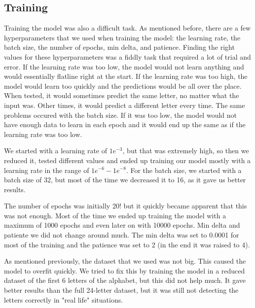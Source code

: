 \documentclass[../paper.tex]{subfiles}
\begin{document}
\subsection{Training}
Training the model was also a difficult task.
As mentioned before, there are a few hyperparameters that we used when training the model: the learning rate, the batch size, the number of epochs, min delta, and patience.
Finding the right values for these hyperparameters was a fiddly task that required a lot of trial and error. If the learning rate was too low, the model would not learn anything
and would essentially flatline right at the start. If the learning rate was too high, the model would learn too quickly and the predictions would be all over the place.
When tested, it would sometimes predict the same letter, no matter what the input was. Other times, it would predict a different letter every time.
The same problems occured with the batch size. If it was too low, the model would not have enough data to learn in each epoch and it would end up the same as if the learning rate was too low.

We started with a learning rate of $1e^{-3}$, but that was extremely high, so then we reduced it, tested different values and ended up training our model mostly with a learning rate in the range of $ 1e^{-6} - 1e^{-8}$.
For the batch size, we started with a batch size of 32, but most of the time we decreased it to 16, as it gave us better results.

The number of epochs was initially 20! but it quickly became apparent that this was not enough. Most of the time we ended up training the model with a maximum of 1000 epochs and even later on with 10000 epochs.
Min delta and patiente we did not change around much. The min delta was set to 0.0001 for most of the training and the patience was set to 2 (in the end it was raised to 4).

As mentioned previously, the dataset that we used was not big. This caused the model to overfit quickly.
We tried to fix this by training the model in a reduced dataset of the first 6 letters of the alphabet, but this did not help much. It gave better results than the full 24-letter dataset, but it was still 
not detecting the letters correctly in "real life" situations.
\end{document}
